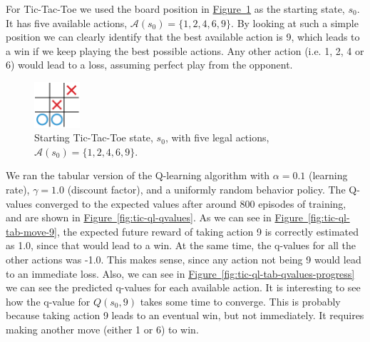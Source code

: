 \documentclass{article}
\newcommand{\GithubURL}[1]{[\href{https://github.com/davidrobles/mlnd-capstone-code/blob/master/#1}{source}]}
\begin{document}


For Tic-Tac-Toe we used the board position in \hyperref[fig:tic-ql-tab-cur]
{Figure~\ref*{fig:tic-ql-tab-cur}} as the starting state, $s_0$. It has five available actions,
$\mathcal{A}(s_0) = \{1, 2, 4, 6, 9\}$. By looking at such a simple position we can clearly identify
that the best available action is 9, which leads to a win if we keep playing the best possible
actions. Any other action (i.e. 1, 2, 4 or 6) would lead to a loss, assuming perfect play from the
opponent.

\begin{figure}[!h]
    \centering
    \includegraphics[width=0.15\textwidth]{figures/tic_ql_tab_current.pdf}
    \caption{Starting Tic-Tac-Toe state, $s_0$, with five legal actions, $\mathcal{A}(s_0) = \{1, 2, 4, 6, 9\}$.}
    \label{fig:tic-ql-tab-cur}
\end{figure}

We ran the tabular version of the Q-learning algorithm with $\alpha = 0.1$ (learning rate),
$\gamma=1.0$ (discount factor), and a uniformly random behavior policy. The Q-values converged to
the expected values after around 800 episodes of training, and are shown in
\hyperref[fig:tic-ql-qvalues] {Figure~\ref*{fig:tic-ql-qvalues}}. As we can see in
\hyperref[fig:tic-ql-tab-move-9] {Figure~\ref*{fig:tic-ql-tab-move-9}}, the expected future reward
of taking action 9 is correctly estimated as 1.0, since that would lead to a win. At the same time,
the q-values for all the other actions was -1.0. This makes sense, since any action not being 9
would lead to an immediate loss. Also, we can see in \hyperref[fig:tic-ql-tab-qvalues-progress]
{Figure~\ref*{fig:tic-ql-tab-qvalues-progress}} we can see the predicted q-values for each available
action. It is interesting to see how the q-value for $Q(s_0, 9)$ takes some time to converge. This
is probably because taking action 9 leads to an eventual win, but not immediately. It requires
making another move (either 1 or 6) to win.

\end{document}
